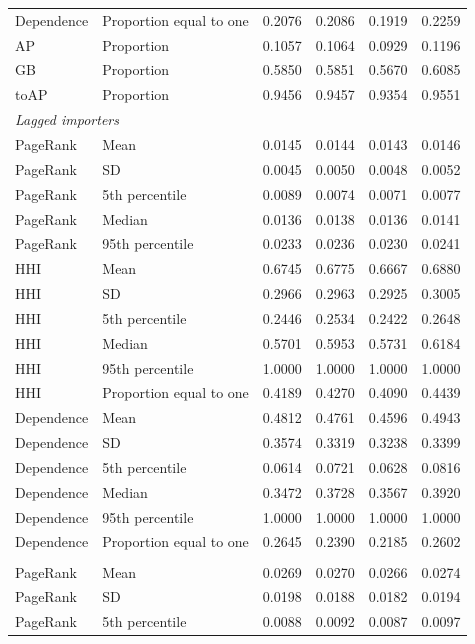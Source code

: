 \documentclass[pdftex,12pt,openright,a4paper,oneside]{book}
\begin{document}
\begin{longtable}{llrrrr}
Dependence & Proportion equal to one & 0.2076 & 0.2086 & 0.1919 & 0.2259 \\
\addlinespace[2pt]
AP & Proportion & 0.1057 & 0.1064 & 0.0929 & 0.1196 \\
GB & Proportion & 0.5850 & 0.5851 & 0.5670 & 0.6085 \\
toAP & Proportion & 0.9456 & 0.9457 & 0.9354 & 0.9551 \\
\midrule
\multicolumn{6}{l}{\textit{Lagged importers}}\\
\midrule
PageRank & Mean & 0.0145 & 0.0144 & 0.0143 & 0.0146 \\
PageRank & SD & 0.0045 & 0.0050 & 0.0048 & 0.0052 \\
PageRank & 5th percentile & 0.0089 & 0.0074 & 0.0071 & 0.0077 \\
PageRank & Median & 0.0136 & 0.0138 & 0.0136 & 0.0141 \\
PageRank & 95th percentile & 0.0233 & 0.0236 & 0.0230 & 0.0241 \\
\addlinespace[2pt]
HHI & Mean & 0.6745 & 0.6775 & 0.6667 & 0.6880 \\
HHI & SD & 0.2966 & 0.2963 & 0.2925 & 0.3005 \\
HHI & 5th percentile & 0.2446 & 0.2534 & 0.2422 & 0.2648 \\
HHI & Median & 0.5701 & 0.5953 & 0.5731 & 0.6184 \\
HHI & 95th percentile & 1.0000 & 1.0000 & 1.0000 & 1.0000 \\
HHI & Proportion equal to one & 0.4189 & 0.4270 & 0.4090 & 0.4439 \\
\addlinespace[2pt]
Dependence & Mean & 0.4812 & 0.4761 & 0.4596 & 0.4943 \\
Dependence & SD & 0.3574 & 0.3319 & 0.3238 & 0.3399 \\
Dependence & 5th percentile & 0.0614 & 0.0721 & 0.0628 & 0.0816 \\
Dependence & Median & 0.3472 & 0.3728 & 0.3567 & 0.3920 \\
Dependence & 95th percentile & 1.0000 & 1.0000 & 1.0000 & 1.0000 \\
Dependence & Proportion equal to one & 0.2645 & 0.2390 & 0.2185 & 0.2602 \\
\addlinespace[2pt]
\midrule
\multicolumn{6}{l}{\textit{Lagged exporters}}\\
\midrule
PageRank & Mean & 0.0269 & 0.0270 & 0.0266 & 0.0274 \\
PageRank & SD & 0.0198 & 0.0188 & 0.0182 & 0.0194 \\
PageRank & 5th percentile & 0.0088 & 0.0092 & 0.0087 & 0.0097 \\

\end{longtable}
\end{document}
